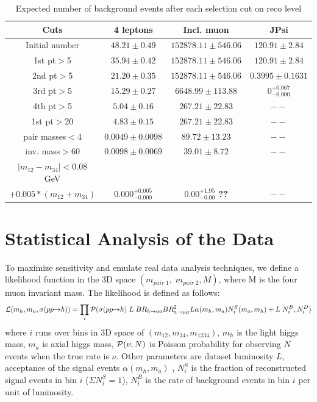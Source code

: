 \documentclass[aps,12pt,superscriptaddress,nofootinbib,floatfix,showpacs]{revtex4}
\begin{document}
\begin{table}[t]
\caption{Expected number of background events after each selection cut on reco level\label{bckgr_cuts_number_reco_level}}
\begin{center}
\begin{tabular}{|c|c|c|c|}
\hline
Cuts & 4 leptons & Incl. muon & JPsi \\ 
\hline
Initial number&            $48.21\pm0.49$    &    $152878.11\pm546.06$    &    $120.91\pm2.84$   \\ 
1st pt$>$5&                $35.94\pm0.42$    &    $152878.11\pm546.06$    &    $120.91\pm2.84$   \\ 
2nd pt$>$5&                $21.20\pm0.35$    &    $152878.11\pm546.06$    &    $0.3995\pm0.1631$ \\ 
3rd pt$>$5&                $15.29\pm0.27$    &    $6648.99\pm113.88$      &    $0^{+0.067}_{-0.000}$  \\ 
4th pt$>$5&                $5.04\pm0.16$     &    $267.21\pm22.83$        &    $--$      \\ 
1st pt$>$20&               $4.83\pm0.15$     &    $267.21\pm22.83$        &    $--$      \\ 
\hline
pair masses$<$4&           $0.0049\pm0.0098$ &    $89.72\pm13.23$         &    $--$      \\ 
inv. mass$>$60 &           $0.0098\pm0.0069$ &    $39.01\pm8.72$          &    $--$      \\ 
$|m_{12}-m_{34}|< 0.08$ GeV  &&&\\       
$+0.005*(m_{12}+m_{34})$ &  $0.000^{+0.005}_{-0.000}$ & {\bf $0.00^{+1.95}_{-0.00}$ ??}  &    $--$    \\ 
\hline
\end{tabular}
\end{center}
\end{table}




\section{Statistical Analysis of the Data}

To maximize sensitivity and emulate real data analysis techniques, we define a likelihood function in the 3D space 
$(m_{pair \; 1}, \; m_{pair \; 2}, M)$, where M is the four muon invariant mass. The likelihood is defined as follows:
\begin{eqnarray}
{\cal L}(m_h, m_a, \sigma(pp \to h)) = \prod_i {\cal P}(\sigma(pp \to h) \; L \; BR_{h \to aa} BR^2_{a \to \mu \mu} L
\alpha(m_h, m_a) N^S_i (m_a, m_h) + L \; N^B_i, N^D_i)
\end{eqnarray}
where $i$ runs over bins in 3D space of $(m_{12}, m_{34}, m_{1234})$, $m_h$ is the light higgs mass, $m_a$ is 
axial higgs mass, ${\cal P}(\nu, N)$ is Poisson probability for observing $N$ events when the true rate is $\nu$.
Other parameters are dataset luminosity $L$, acceptance of the signal events $\alpha (m_h, m_a)$ , $N^S_i$ is the 
fraction of reconstructed signal events in bin $i$ ($\Sigma N^S_i = 1$), $N^B_i$ is the rate of background events 
in bin $i$ per unit of luminosity.
\end{document}
